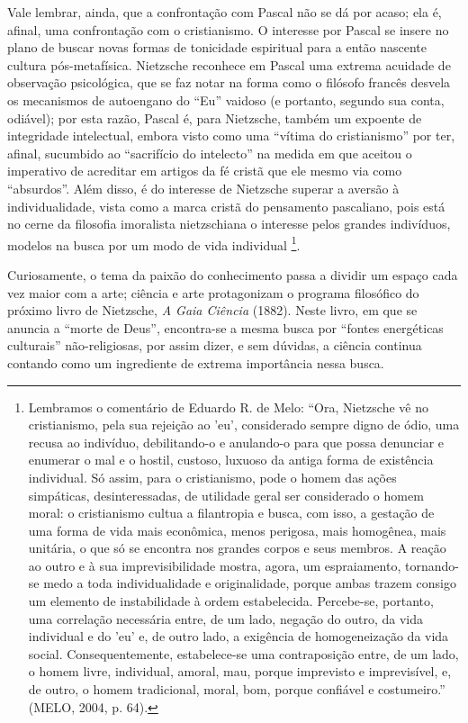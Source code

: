 \documentclass[
	12pt,				%
	openright,			%
	oneside,			%
	a4paper,			%
	english,			%
	french,				%
	spanish,			%
	brazil				%
	]{abntex2}
\begin{document}
Vale lembrar, ainda, que a confrontação com Pascal não se dá por acaso; ela é, afinal, uma confrontação com o cristianismo. O interesse por Pascal se insere no plano de buscar novas formas de tonicidade espiritual para a então nascente cultura pós-metafísica. Nietzsche reconhece em Pascal uma extrema acuidade de observação psicológica, que se faz notar na forma como o filósofo francês desvela os mecanismos de autoengano do “Eu” vaidoso (e portanto, segundo sua conta, odiável); por esta razão, Pascal é, para Nietzsche, também um expoente de integridade intelectual, embora visto como uma “vítima do cristianismo” por ter, afinal, sucumbido ao “sacrifício do intelecto” na medida em que aceitou o imperativo de acreditar em artigos da fé cristã que ele mesmo via como “absurdos”. Além disso, é do interesse de Nietzsche superar a aversão à individualidade, vista como a marca cristã do pensamento pascaliano, pois está no cerne da filosofia imoralista nietzschiana o interesse pelos grandes indivíduos, modelos na busca por um modo de vida individual
\footnote{Lembramos o comentário de Eduardo R. de Melo: “Ora, Nietzsche vê no cristianismo, pela sua rejeição ao 'eu', considerado sempre digno de ódio, uma recusa ao indivíduo, debilitando-o e anulando-o para que possa denunciar e enumerar o mal e o hostil, custoso, luxuoso da antiga forma de existência individual. Só assim, para o cristianismo, pode o homem das ações simpáticas, desinteressadas, de utilidade geral ser considerado o homem moral: o cristianismo cultua a filantropia e busca, com isso, a gestação de uma forma de vida mais econômica, menos perigosa, mais homogênea, mais unitária, o que só se encontra nos grandes corpos e seus membros. A reação ao outro e à sua imprevisibilidade mostra, agora, um espraiamento, tornando-se medo a toda individualidade e originalidade, porque ambas trazem consigo um elemento de instabilidade à ordem estabelecida. Percebe-se, portanto, uma correlação necessária entre, de um lado, negação do outro, da vida individual e do 'eu' e, de outro lado, a exigência de homogeneização da vida social. Consequentemente, estabelece-se uma contraposição entre, de um lado, o homem livre, individual, amoral, mau, porque imprevisto e imprevisível, e, de outro, o homem tradicional, moral, bom, porque confiável e costumeiro.” (MELO, 2004, p. 64).}.

Curiosamente, o tema da paixão do conhecimento passa a dividir um espaço cada vez maior com a arte; ciência e arte protagonizam o programa filosófico do próximo livro de Nietzsche, \textit{A Gaia Ciência} (1882). Neste livro, em que se anuncia a “morte de Deus”, encontra-se a mesma busca por “fontes energéticas culturais” não-religiosas, por assim dizer, e sem dúvidas, a ciência continua contando como um ingrediente de extrema importância nessa busca. 
\end{document}
